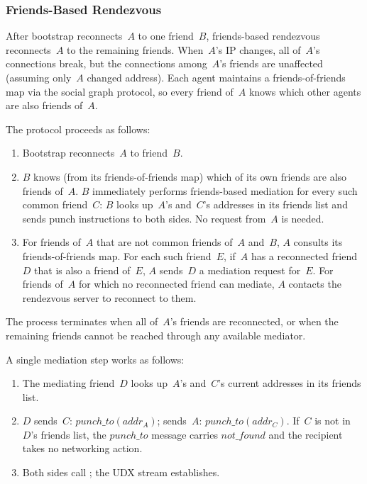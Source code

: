 \subsubsection{Friends-Based Rendezvous}
\label{sec:friends-rv-protocol}

After bootstrap reconnects~$A$ to one friend~$B$, friends-based rendezvous reconnects~$A$ to the remaining friends.  When~$A$'s IP changes, all of~$A$'s connections break, but the connections among~$A$'s friends are unaffected (assuming only~$A$ changed address).  Each agent maintains a friends-of-friends map via the social graph protocol, so every friend of~$A$ knows which other agents are also friends of~$A$.

The protocol proceeds as follows:
\begin{enumerate}
\item Bootstrap reconnects~$A$ to friend~$B$.
\item $B$ knows (from its friends-of-friends map) which of its own friends are also friends of~$A$.  $B$ immediately performs friends-based mediation for every such common friend~$C$: $B$ looks up~$A$'s and~$C$'s addresses in its friends list and sends punch instructions to both sides.  No request from~$A$ is needed.
\item For friends of~$A$ that are not common friends of~$A$ and~$B$, $A$ consults its friends-of-friends map.  For each such friend~$E$, if~$A$ has a reconnected friend~$D$ that is also a friend of~$E$, $A$ sends~$D$ a mediation request for~$E$.  For friends of~$A$ for which no reconnected friend can mediate, $A$ contacts the rendezvous server to reconnect to them.
\end{enumerate}

The process terminates when all of~$A$'s friends are reconnected, or when the remaining friends cannot be reached through any available mediator.

A single mediation step works as follows:
\begin{enumerate}
\item The mediating friend~$D$ looks up~$A$'s and~$C$'s current addresses in its friends list.
\item $D$ sends~$C$: $\mathit{punch\_to}(\mathit{addr}_A)$; sends~$A$: $\mathit{punch\_to}(\mathit{addr}_C)$.  If~$C$ is not in~$D$'s friends list, the $\mathit{punch\_to}$ message carries $\mathit{not\_found}$ and the recipient takes no networking action.
\item Both sides call ; the UDX stream establishes.
\end{enumerate}

